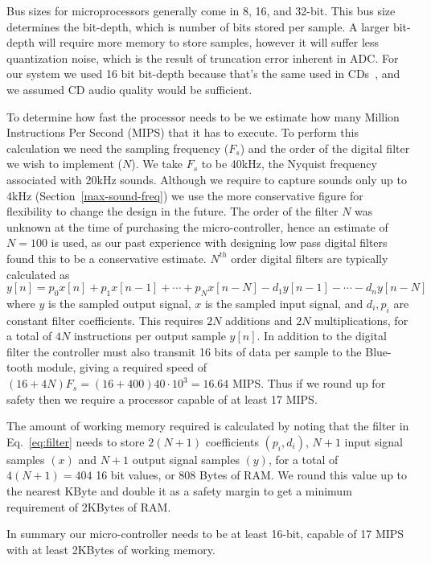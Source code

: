 Bus sizes for microprocessors generally come in 8, 16, and 32-bit. This bus size determines the bit-depth, which is number of bits stored per sample. A larger bit-depth will require more memory to store samples, however it will suffer less quantization noise, which is the result of truncation error inherent in ADC. For our system we used 16 bit bit-depth because that's the same used in CDs~\cite[p.~27]{Schroder2011}, and we assumed CD audio quality would be sufficient.

To determine how fast the processor needs to be we estimate how many Million Instructions Per Second (MIPS) that it has to execute. To perform this calculation we need the sampling frequency ($F_s$) and the order of the digital filter we wish to implement ($N$). We take $F_s$ to be 40kHz, the Nyquist frequency associated with 20kHz sounds. Although we require to capture sounds only up to 4kHz (Section~\ref{max-sound-freq}) we use the more conservative figure for flexibility to change the design in the future. The order of the filter $N$ was unknown at the time of purchasing the micro-controller, hence an estimate of $N=100$ is used, as our past experience with designing low pass digital filters found this to be a conservative estimate. $N^{th}$ order digital filters are typically calculated as~\cite[p.~164]{Mitra2011}
\begin{equation}
y[n] = p_0 x[n] + p_1 x[n-1] + \cdots + p_N x[n-N] - d_1 y[n-1] - \cdots - d_n y[n-N]
\label{eq:filter}
\end{equation}
where $y$ is the sampled output signal, $x$ is the sampled input signal, and $d_i, p_i$ are constant filter coefficients. This requires $2N$ additions and $2N$ multiplications, for a total of $4N$ instructions per output sample $y[n]$. In addition to the digital filter the controller must also transmit 16 bits of data per sample to the Blue-tooth module, giving a required speed of $(16+4N)F_s=(16+400)40\cdot10^3=16.64$ MIPS. Thus if we round up for safety then we require a processor capable of at least 17 MIPS.

The amount of working memory required is calculated by noting that the filter in Eq.~\ref{eq:filter} needs to store $2(N+1)$ coefficients $(p_i, d_i)$, $N+1$ input signal samples $(x)$ and $N+1$ output signal samples $(y)$, for a total of $4(N+1)=404$ 16 bit values, or 808 Bytes of RAM. We round this value up to the nearest KByte and double it as a safety margin to get a minimum requirement of 2KBytes of RAM.

In summary our micro-controller needs to be at least 16-bit, capable of 17 MIPS with at least 2KBytes of working memory.

